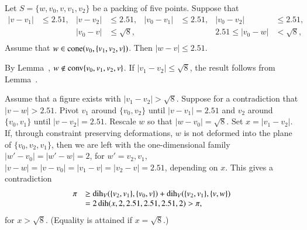 \begin{tarskidata}
\begin{tarski}

\begin{lemma}
Let $S=\{w,v_0,v,v_1,v_2\}$ be a packing of five points.
Suppose that
  $$\begin{array}{rlrlrlrl}
    |v-v_1|&\le 2.51, &
    |v-v_2|&\le 2.51, &
    |v_0-v_1|&\le 2.51,&
    |v_0-v_2|&\le 2.51,\\
    && |v_0-v|&\le \sqrt8,&
    &&2.51\le|v_0-w|&< \sqrt8,\\
  \end{array}
  $$
Assume that $w\in{\operatorname{cone}}(v_0,\{v_1,v_2,v\})$. 
Then $|w-v|\le 2.51$.
\end{lemma}

\begin{proved}  By Lemma~, 
$w\not\in{\operatorname{conv}}\{v_0,v_1,v_2,v\}$.  
If $|v_1-v_2|\le \sqrt{8}$, the result follows from
Lemma~. 

Assume that a figure exists with $|v_1-v_2|>\sqrt{8}$. Suppose for a
contradiction that $|v-w|>2.51$.    Pivot $v_1$ around $\{v_0,v_2\}$ until
$|v-v_1|=2.51$ and $v_2$ around $\{v_0,v_1\}$ until $|v-v_2|=2.51$.  Rescale
$w$ so that $|w-v_0|=\sqrt{8}$. Set $x = |v_1-v_2|$. If, through constraint
preserving deformations, $w$ is not deformed into the plane of 
$\{v_0,v_2,v_1\}$,
then we are left with the one-dimensional family $|w'-v_0|=|w'-w|=2$, for
$w'=v_2,v_1$, $|v-w|=|v-v_0|=|v_1-v|=|v_2-v|=2.51$, depending on  $x$. This
gives a contradiction
    $$
    \begin{array}{lll}
        \pi &\ge \operatorname{dih}_V(\{v_2,v_1\},\{v_0,v\}) + \operatorname{dih}_V(\{v_2,v_1\},\{v,w\})\\
        &= 2\operatorname{dih}(x,2,2.51,2.51,2.51,2)
         > \pi,
    \end{array}
    $$
for $x>\sqrt{8}$.
(Equality is attained if $x=\sqrt{8}$.)


\end{proved}
\end{tarski}
\end{tarskidata}
